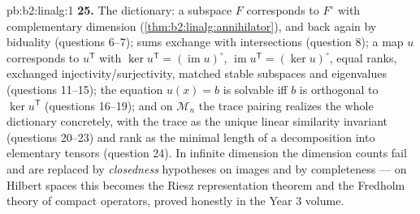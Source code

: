 \begin{solution}{pb:b2:linalg:1}
\textbf{25.} The dictionary: a subspace $F$ corresponds to
$F^\circ$ with complementary dimension
(\cref{thm:b2:linalg:annihilator}), and back again by biduality
(questions 6--7); sums exchange with intersections (question 8);
a map $u$ corresponds to $u^{\mathsf T}$ with $\ker u^{\mathsf T}
= (\operatorname{im}u)^\circ$, $\operatorname{im}u^{\mathsf T} =
(\ker u)^\circ$, equal ranks, exchanged
injectivity/surjectivity, matched stable subspaces and
eigenvalues (questions 11--15); the equation $u(x) = b$ is
solvable iff $b$ is orthogonal to $\ker u^{\mathsf T}$
(questions 16--19); and on $\mathcal{M}_n$ the trace pairing
realizes the whole dictionary concretely, with the trace as the
unique linear similarity invariant (questions 20--23) and rank
as the minimal length of a decomposition into elementary
tensors (question 24). In infinite dimension the dimension
counts fail and are replaced by \emph{closedness} hypotheses on
images and by completeness --- on Hilbert spaces this becomes
the Riesz representation theorem and the Fredholm theory of
compact operators, proved honestly in the Year 3 volume.
\end{solution}
